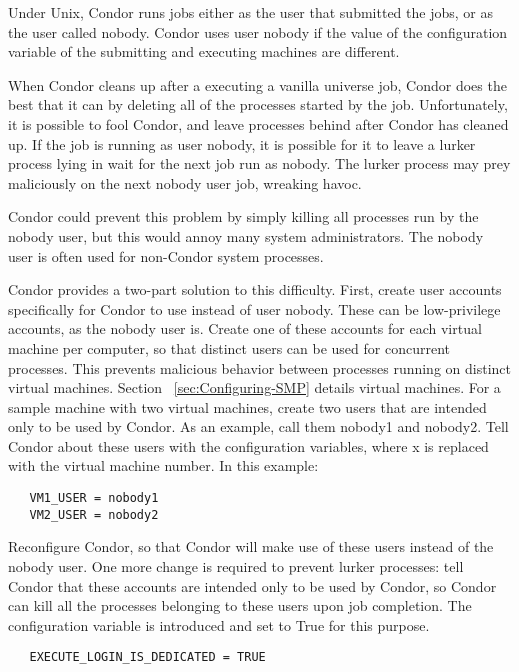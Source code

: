 Under Unix, Condor runs jobs either as the user that submitted the jobs,
or as the user called nobody.
Condor uses user nobody if the value of the 
configuration variable of the
submitting and executing machines are different.

When Condor cleans up after a executing a vanilla universe job,
Condor does the best that it can by
deleting all of the processes started by the job.
Unfortunately, it is possible to fool Condor,
and leave processes behind after Condor has cleaned up.
If the job is running as user nobody,
it is possible for it to leave a lurker process lying in wait
for the next job run as nobody.
The lurker process may prey maliciously on the next nobody user job,
wreaking havoc.

Condor could prevent this problem by simply killing all processes run by
the nobody user, but this would annoy many system administrators.
The nobody user is often used for non-Condor system processes.

Condor provides a two-part solution to this difficulty.
First, create user accounts specifically for Condor to use instead
of user nobody.
These can be low-privilege accounts,
as the nobody user is.
Create one of these accounts for each
virtual machine per computer,
so that distinct users can be used for concurrent processes.
This prevents malicious behavior between
processes running on distinct virtual machines.
Section ~\ref{sec:Configuring-SMP} details virtual machines.
For a sample machine with two virtual machines,
create two users that are intended only to be used by Condor.
As an example, call them nobody1 and nobody2.
Tell Condor about these users
with the  configuration variables,
where x is replaced with the
virtual machine number. In this example:

\begin{verbatim}
   VM1_USER = nobody1
   VM2_USER = nobody2
\end{verbatim}

Reconfigure Condor, so that Condor will make use of these users
instead of the nobody user.
One more change is required to prevent lurker processes:
tell Condor that these accounts are intended only to be used by Condor,
so Condor can kill all the processes belonging to these users upon
job completion.
The configuration variable 
is introduced and set to True for this purpose.

\begin{verbatim}
   EXECUTE_LOGIN_IS_DEDICATED = TRUE
\end{verbatim}

